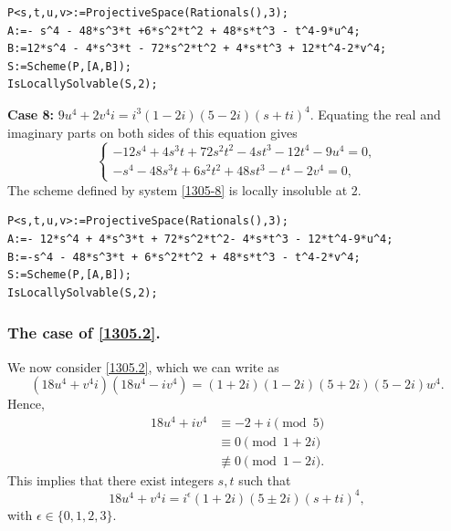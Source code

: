 \documentclass[a4paper,12pt,english,reqno]{amsart}
\begin{document}
\begin{lstlisting}
P<s,t,u,v>:=ProjectiveSpace(Rationals(),3);
A:=- s^4 - 48*s^3*t +6*s^2*t^2 + 48*s*t^3 - t^4-9*u^4;
B:=12*s^4 - 4*s^3*t - 72*s^2*t^2 + 4*s*t^3 + 12*t^4-2*v^4;
S:=Scheme(P,[A,B]);
IsLocallySolvable(S,2);
\end{lstlisting}
{\bf Case 8:} $9u^4+2v^4i=i^3(1-2i)(5-2i)(s+ti)^4$. Equating the real and imaginary parts on both sides of this equation gives
\begin{equation}\label{1305-8}
\begin{cases}
-12s^4 + 4s^3t + 72s^2t^2 - 4st^3 - 12t^4 - 9u^4=0,\\
-s^4 - 48s^3t + 6s^2t^2 + 48st^3 - t^4 - 2v^4=0,
\end{cases}
\end{equation}
The scheme defined by system \eqref{1305-8} is locally insoluble at $2$.


\begin{lstlisting}
P<s,t,u,v>:=ProjectiveSpace(Rationals(),3);
A:=- 12*s^4 + 4*s^3*t + 72*s^2*t^2- 4*s*t^3 - 12*t^4-9*u^4;
B:=-s^4 - 48*s^3*t + 6*s^2*t^2 + 48*s*t^3 - t^4-2*v^4;
S:=Scheme(P,[A,B]);
IsLocallySolvable(S,2);
\end{lstlisting}


\subsubsection{{\bf{The case of \eqref{1305.2}}.}}%
We now consider \eqref{1305.2}, which we can write as
\begin{equation} (18u^4+v^4i)(18u^4-iv^4)=(1+2i)(1-2i)(5+2i)(5-2i)w^4.
\end{equation}
Hence, \[\begin{split}
    18u^4+iv^4&\equiv -2+i\pmod{5}\\
    &\equiv 0\pmod{1+2i}\\
    &\not\equiv 0\pmod{1-2i}.
\end{split}\] 
This implies that there exist integers $s,t$ such that 
\[18u^4+v^4i=i^{\epsilon}(1+2i)(5\pm 2i)(s+ti)^4,\]
with $\epsilon \in \{0,1,2,3\}$.
\end{document}
